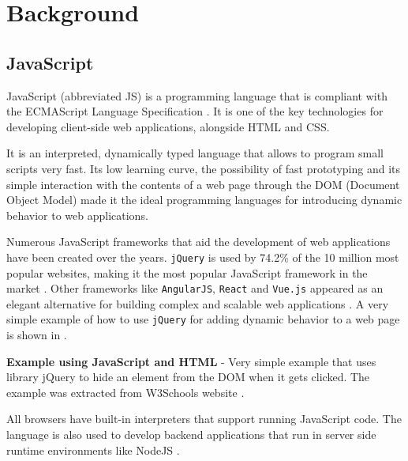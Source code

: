 \chapter{Background}\label{chap:background}
\section{JavaScript} \label{sec:background-javascript}
JavaScript (abbreviated JS) is a programming language that is compliant with the ECMAScript Language Specification \citep{ecma-script}. It is one of the
key technologies for developing client-side web applications, alongside HTML and CSS.

It is an interpreted, dynamically typed language that allows to program small scripts very fast.  Its low learning curve, the possibility of fast prototyping and its simple interaction with the contents of a web page through the DOM (Document Object Model) made it the ideal programming languages for introducing dynamic behavior to web applications.

Numerous JavaScript frameworks that aid the development of web applications have been created over the years. \texttt{jQuery} is used by 74.2\% of the 10 million most popular websites, making it the most popular JavaScript framework in the market \citep{jquery}\citep{w3techs-javascript-libraries-statistics}. Other frameworks like \texttt{AngularJS}, \texttt{React} and \texttt{Vue.js} appeared as an elegant alternative for building complex and scalable web applications \citep{angularjs}\citep{react}\citep{vuejs}. A very simple example of how to use \texttt{jQuery} for adding dynamic behavior to a web page is shown in .

\begin{code}
	\captionsetup{aboveskip=0pt, belowskip=10pt}
	\caption[Example using JavaScript and HTML]{\textbf{Example using JavaScript and HTML} - Very simple example that uses library jQuery to hide an element from the DOM when it gets clicked. The example was extracted from W3Schools website \citep{w3schools}.}
	\label{code:background-jquery-example}
\end{code}

All browsers have built-in interpreters that support running JavaScript code. The language is also used to develop backend applications that run in server side runtime environments like NodeJS \citep{nodejs}.

